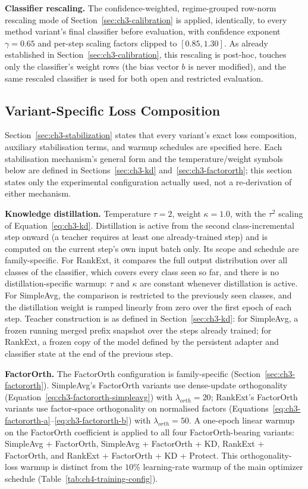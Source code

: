\textbf{Classifier rescaling.} The confidence-weighted, regime-grouped
row-norm rescaling mode of Section~\ref{sec:ch3-calibration} is applied,
identically, to every method variant's final classifier before evaluation,
with confidence exponent $\gamma=0.65$ and per-step scaling factors clipped
to $[0.85, 1.30]$. As already established in
Section~\ref{sec:ch3-calibration}, this rescaling is post-hoc, touches only
the classifier's weight rows (the bias vector $b$ is never modified), and
the same rescaled classifier is used for both open and restricted
evaluation.

\subsection{Variant-Specific Loss Composition}
\label{sec:ch4-loss-composition}

Section~\ref{sec:ch3-stabilization} states that every variant's exact loss
composition, auxiliary stabilisation terms, and warmup schedules are
specified here. Each stabilisation mechanism's general form and the
temperature/weight symbols below are defined in
Sections~\ref{sec:ch3-kd} and~\ref{sec:ch3-factororth}; this section states
only the experimental configuration actually used, not a re-derivation of
either mechanism.

\textbf{Knowledge distillation.} Temperature $\tau=2$, weight $\kappa=1.0$,
with the $\tau^2$ scaling of Equation~\eqref{eq:ch3-kd}. Distillation is
active from the second class-incremental step onward (a teacher requires at
least one already-trained step) and is computed on the current step's own
input batch only. Its scope and schedule are family-specific. For RankExt,
it compares the full output distribution over all classes of the
classifier, which covers every class seen so far, and
there is no distillation-specific warmup: $\tau$ and $\kappa$ are constant
whenever distillation is active. For SimpleAvg, the comparison is
restricted to the previously seen classes, and the distillation weight is
ramped linearly from zero over the first epoch of each step. Teacher
construction is as defined in Section~\ref{sec:ch3-kd}: for SimpleAvg, a
frozen running merged prefix snapshot over the steps already trained; for
RankExt, a frozen copy of the model defined by the persistent adapter and
classifier state at the end of the previous step.

\textbf{FactorOrth.} The FactorOrth configuration is family-specific
(Section~\ref{sec:ch3-factororth}). SimpleAvg's FactorOrth variants use
dense-update orthogonality (Equation~\eqref{eq:ch3-factororth-simpleavg})
with $\lambda_{orth}=20$; RankExt's FactorOrth variants use factor-space
orthogonality on normalised factors
(Equations~\eqref{eq:ch3-factororth-a}--\eqref{eq:ch3-factororth-b}) with
$\lambda_{orth}=50$. A one-epoch linear warmup on the FactorOrth coefficient
is applied to all four FactorOrth-bearing variants: SimpleAvg + FactorOrth,
SimpleAvg + FactorOrth + KD, RankExt + FactorOrth, and RankExt + FactorOrth
+ KD + Protect. This
orthogonality-loss warmup is distinct from the $10\%$ learning-rate warmup
of the main optimizer schedule (Table~\ref{tab:ch4-training-config}).

